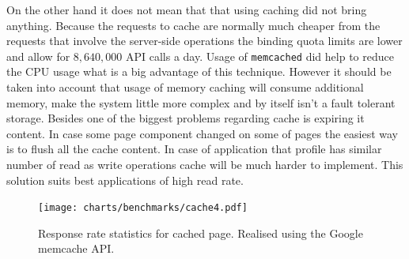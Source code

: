 

On the other hand it does not mean that that using caching did not bring anything. Because the requests to cache are normally much cheaper from the requests that involve the server-side operations the binding quota limits are lower and allow for $8,640,000$ API calls a day. Usage of \texttt{memcached} did help to reduce the CPU usage what is a big advantage of this technique. However it should be taken into account that usage of memory caching will consume additional memory, make the system little more complex and by itself isn't a fault tolerant storage. Besides one of the biggest problems regarding cache is expiring it content. In case some page component changed on some of pages the easiest way is to flush all the cache content. In case of application that profile has similar number of read as write operations cache will be much harder to implement. This solution suits best applications of high read rate.      
\begin{figure}[ht]
  \begin{center}
	\texttt{[image: charts/benchmarks/cache4.pdf]}
  \end{center}
  \caption{Response rate statistics for cached page. Realised using the Google memcache API.}
  \label{fig:sm_benchmark_cache}
\end{figure}

